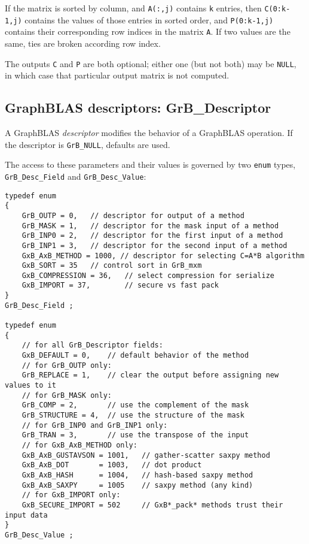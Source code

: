 \documentclass[12pt]{article}
\begin{document}
If the matrix is sorted by column, and \verb'A(:,j)' contains \verb'k' entries,
then \verb'C(0:k-1,j)' contains the values of those entries in sorted order,
and \verb'P(0:k-1,j)' contains their corresponding row indices in the matrix
\verb'A'.  If two values are the same, ties are broken according row index.

The outputs \verb'C' and \verb'P' are both optional; either one (but not both)
may be \verb'NULL', in which case that particular output matrix is not
computed.

\newpage
\subsection{GraphBLAS descriptors: {\sf GrB\_Descriptor}} %
\label{descriptor}

A GraphBLAS {\em descriptor} modifies the behavior of a GraphBLAS operation.
If the descriptor is \verb'GrB_NULL', defaults are used.

The access to these parameters and their values is governed
by two \verb'enum' types, \verb'GrB_Desc_Field' and \verb'GrB_Desc_Value':

\begin{mdframed}[userdefinedwidth=6in]
{\footnotesize
\begin{verbatim}
typedef enum
{
    GrB_OUTP = 0,   // descriptor for output of a method
    GrB_MASK = 1,   // descriptor for the mask input of a method
    GrB_INP0 = 2,   // descriptor for the first input of a method
    GrB_INP1 = 3,   // descriptor for the second input of a method
    GxB_AxB_METHOD = 1000, // descriptor for selecting C=A*B algorithm
    GxB_SORT = 35   // control sort in GrB_mxm
    GxB_COMPRESSION = 36,   // select compression for serialize
    GxB_IMPORT = 37,        // secure vs fast pack
}
GrB_Desc_Field ;

typedef enum
{
    // for all GrB_Descriptor fields:
    GxB_DEFAULT = 0,    // default behavior of the method
    // for GrB_OUTP only:
    GrB_REPLACE = 1,    // clear the output before assigning new values to it
    // for GrB_MASK only:
    GrB_COMP = 2,       // use the complement of the mask
    GrB_STRUCTURE = 4,  // use the structure of the mask
    // for GrB_INP0 and GrB_INP1 only:
    GrB_TRAN = 3,       // use the transpose of the input
    // for GxB_AxB_METHOD only:
    GxB_AxB_GUSTAVSON = 1001,   // gather-scatter saxpy method
    GxB_AxB_DOT       = 1003,   // dot product
    GxB_AxB_HASH      = 1004,   // hash-based saxpy method
    GxB_AxB_SAXPY     = 1005    // saxpy method (any kind)
    // for GxB_IMPORT only:
    GxB_SECURE_IMPORT = 502     // GxB*_pack* methods trust their input data
}
GrB_Desc_Value ;
\end{verbatim} } \end{mdframed}
\end{document}

